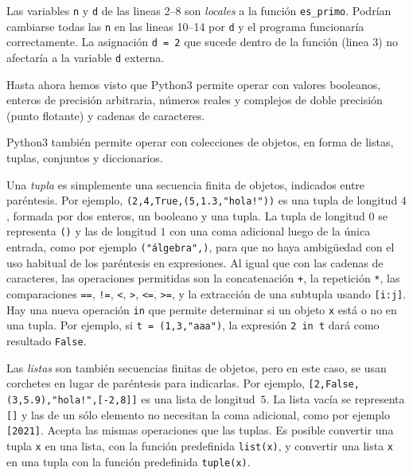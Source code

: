 \documentclass[a4paper, 11pt]{article}
\theoremstyle{plain}
\theoremstyle{definition}
\begin{document}
\bigskip

Las variables \texttt{n} y \texttt{d} de las lineas 2--8 son \textit{locales}
a la función \texttt{es\_primo}. Podrían cambiarse todas las \texttt{n} en las
lineas 10--14 por \texttt{d} y el programa funcionaría correctamente. La
asignación \texttt{d = 2} que sucede dentro de la función (linea 3) no afectaría
a la variable \texttt{d} externa.

\bigskip

Hasta ahora hemos visto que Python3 permite operar con valores booleanos, enteros
de precisión arbitraria, números reales y complejos de doble precisión (punto
flotante) y cadenas de caracteres.

\bigskip

Python3 también permite operar con colecciones de objetos, en forma de listas,
tuplas, conjuntos y diccionarios.

\bigskip

Una \emph{tupla} es simplemente una secuencia finita de objetos, indicados
entre paréntesis. Por ejemplo, \texttt{(2,4,True,(5,1.3,"hola!"))} es
una tupla de longitud $4$, formada por dos enteros, un booleano y una
tupla. La tupla de longitud $0$ se representa \texttt{()} y las de
longitud $1$ con una coma adicional luego de la única entrada, como
por ejemplo \texttt{("álgebra",)}, para que no haya ambigüedad con el
uso habitual de los paréntesis en expresiones. Al igual que con las
cadenas de caracteres, las operaciones permitidas son la concatenación
\texttt{+}, la repetición \texttt{*}, las comparaciones \texttt{==},
\texttt{!=}, \texttt{<}, \texttt{>}, \texttt{<=}, \texttt{>=}, y la
extracción de una subtupla usando \texttt{[i:j]}. Hay una nueva operación
\texttt{in} que permite determinar si un objeto \texttt{x} está o no
en una tupla. Por ejemplo, si \texttt{t = (1,3,"aaa")}, la expresión
\texttt{2 in t} dará como resultado \texttt{False}.

\bigskip

Las \emph{listas} son también secuencias finitas de objetos, pero en este
caso, se usan corchetes en lugar de paréntesis para indicarlas. Por
ejemplo, \texttt{[2,False,(3,5.9),"hola!",[-2,8]]} es una lista de
longitud~$5$. La lista vacía se representa \texttt{[]} y las de un
sólo elemento no necesitan la coma adicional, como por ejemplo
\texttt{[2021]}. Acepta las mismas operaciones que las tuplas. Es
posible convertir una tupla \texttt{x} en una lista, con la función
predefinida \texttt{list(x)}, y convertir una lista \texttt{x} en una
tupla con la función predefinida \texttt{tuple(x)}.
\end{document}
